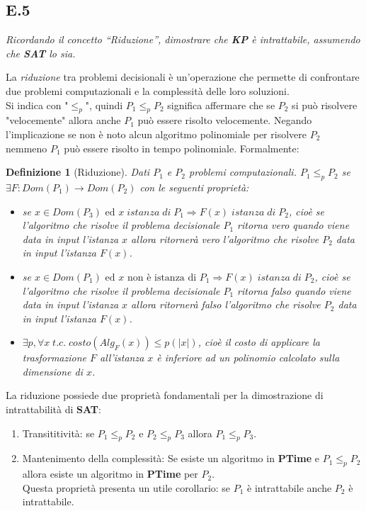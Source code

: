 \documentclass[a4paper]{article}
\newtheorem*{definition}{Definizione}
\newcommand{\red}{\leq_p}
\begin{document}
\subsection{E.5}
\emph{Ricordando il concetto “Riduzione”, dimostrare che \textbf{KP} è intrattabile, assumendo che \textbf{SAT} lo sia.}


La \textit{riduzione} tra problemi decisionali è un'operazione che permette di confrontare due problemi computazionali e la complessità delle loro soluzioni.\\
Si indica con "$\leq_p$", quindi $P_1 \leq_p P_2$ significa affermare che se $P_2$ si può risolvere "velocemente" allora anche $P_1$ può essere risolto velocemente.
Negando l'implicazione se non è noto alcun algoritmo polinomiale per risolvere $P_2$ nemmeno $P_1$ può essere risolto in tempo polinomiale.
Formalmente:
\begin{definition}[Riduzione]
	Dati $P_1$ e $P_2$ problemi computazionali. $P_1 \red P_2$ se $\exists F: Dom(P_1) \rightarrow Dom(P_2)$ con le seguenti proprietà:
	\begin{itemize}
		\item se $x \in Dom(P_3) \text{ ed } x \; istanza \; di \; P_1 \Rightarrow F(x) \; istanza \; di \; P_2$, cioè se l'algoritmo che risolve il problema decisionale $P_1$ ritorna \textit{vero} quando viene data in input l'istanza $x$ allora ritornerà \textit{vero} l'algoritmo che risolve $P_2$ data in input l'istanza $F(x)$.
		\item se $x \in Dom(P_1) \text{ ed } x \text{ non è istanza di }P_1 \Rightarrow F(x) \; istanza \; di \; P_2$, cioè se l'algoritmo che risolve il problema decisionale $P_1$ ritorna \textit{falso} quando viene data in input l'istanza $x$ allora ritornerà \textit{falso} l'algoritmo che risolve $P_2$ data in input l'istanza $F(x)$.
		\item $\exists p, \forall x \; t.c. \; costo(Alg_F(x))\leq p(\lvert x \rvert)$, cioè il costo di applicare la trasformazione $F$ all'istanza $x$ è inferiore ad un polinomio calcolato sulla dimensione di $x$.
	\end{itemize}
\end{definition}
La riduzione possiede due proprietà fondamentali per la dimostrazione di intrattabilità di \textbf{SAT}:
\begin{enumerate}
	\item Transititività: se $P_1 \red P_2$ e $P_2 \red P_3$ allora $P_1 \red P_3$.
	\item Mantenimento della complessità: Se esiste un algoritmo in \textbf{PTime} e $P_1 \red P_2$ allora esiste un algoritmo in \textbf{PTime} per $P_2$.\\
		Questa proprietà presenta un utile corollario: se $P_1$ è intrattabile anche $P_2$ è intrattabile.
\end{enumerate}
\end{document}
